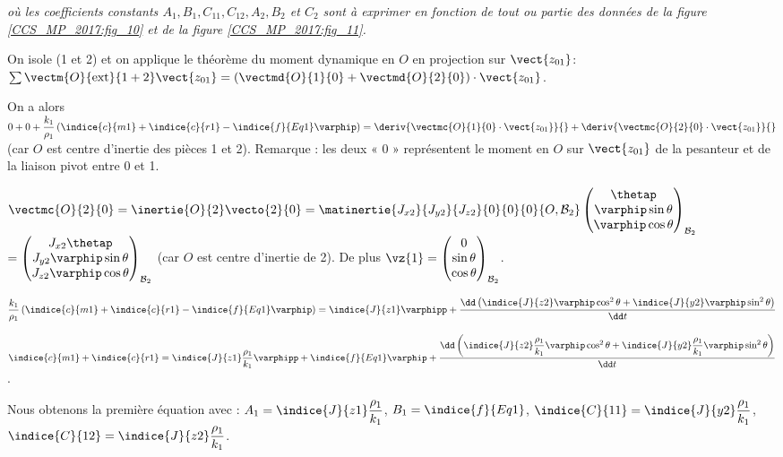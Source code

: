 \textit{où les coefficients constants $A_{1}, B_{1}, C_{11}, C_{12}, A_{2}, B_{2}$ et $C_{2}$ sont à exprimer en fonction de tout ou partie des données de la figure \ref{CCS_MP_2017:fig_10} et de la figure \ref{CCS_MP_2017:fig_11}.}

\ifprof
\begin{corrige}
On isole (1 et 2) et on applique le théorème du moment dynamique en $O$ en projection sur $\vect{z_{01}}$:
$\sum \vectm{O}{\text{ext}}{1+2} \vect{z_{01}}  = \left(\vectmd{O}{1}{0} + \vectmd{O}{2}{0}\right)\cdot \vect{z_{01}}$.

On a alors  
$0+0+\dfrac{k_1}{\rho_1} \left(\indice{c}{m1}+\indice{c}{r1}-\indice{f}{Eq1} \varphip \right)=
\deriv{\vectmc{O}{1}{0}\cdot \vect{z_{01}}}{} + \deriv{\vectmc{O}{2}{0}\cdot \vect{z_{01}}}{}$
(car $O$ est centre d’inertie des pièces 1 et 2). Remarque : les deux « 0 » représentent le moment en $O$ sur $\vect{z_{01}}$ de la pesanteur et de la liaison pivot entre 0 et 1.

$\vectmc{O}{2}{0} = \inertie{O}{2} \vecto{2}{0} 
= \matinertie{J_{x2}}{J_{y2}}{J_{z2}}{0}{0}{0}{O,\mathcal{B}_2} \begin{pmatrix} \thetap \\ \varphip\sin\theta \\ \varphip \cos \theta \end{pmatrix}_{\mathcal{B}_2}$
$=\begin{pmatrix} J_{x2} \thetap \\ J_{y2}\varphip\sin\theta \\ J_{z2}\varphip \cos \theta \end{pmatrix}_{\mathcal{B}_2}$  (car $O$ est centre d’inertie de 2). De plus $\vz{1}=\begin{pmatrix} 0 \\ \sin\theta \\ \cos \theta \end{pmatrix}_{\mathcal{B}_2}$.

$\dfrac{k_1}{\rho_1} \left(\indice{c}{m1}  +\indice{c}{r1}  -\indice{f}{Eq1} \varphip \right)=\indice{J}{z1} \varphipp+\dfrac{\dd \left(\indice{J}{z2} \varphip  \cos^2 \theta+\indice{J}{y2} \varphip \sin^2 \theta\right)}{\dd t}$
  
$\indice{c}{m1}  +\indice{c}{r1}  =\indice{J}{z1}\dfrac{\rho_1}{k_1}\varphipp+\indice{f}{Eq1} \varphip+\dfrac{\dd \left(
\indice{J}{z2}\dfrac{\rho_1}{k_1}\varphip \cos^2 \theta+\indice{J}{y2}\dfrac{\rho_1}{k_1}\varphip \sin^2 \theta \right)}{\dd t}$.


Nous obtenons la première équation avec : $A_1=\indice{J}{z1}\dfrac{\rho_1}{k_1}$, $B_1=\indice{f}{Eq1}$, $\indice{C}{11}=\indice{J}{y2}\dfrac{\rho_1}{k_1}$, $\indice{C}{12}=\indice{J}{z2}\dfrac{\rho_1}{k_1}$.  

\vspace{1cm}


\end{corrige}
\else
\fi





